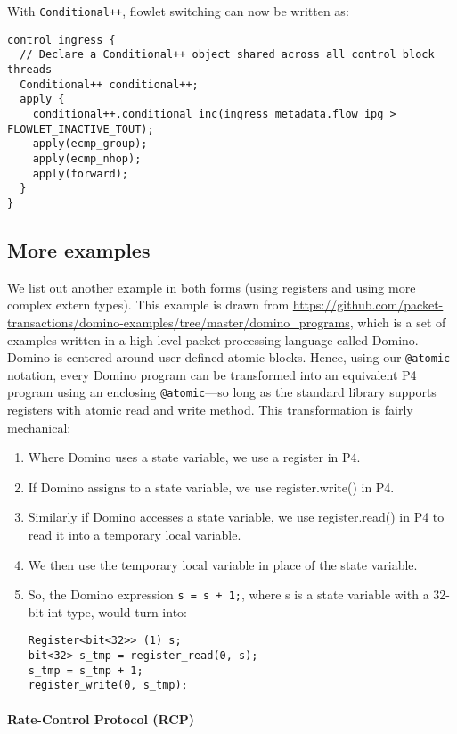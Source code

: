 With \texttt{Conditional++}, flowlet switching can now be written as:
\begin{verbatim}
control ingress {
  // Declare a Conditional++ object shared across all control block threads
  Conditional++ conditional++;
  apply {
    conditional++.conditional_inc(ingress_metadata.flow_ipg > FLOWLET_INACTIVE_TOUT);
    apply(ecmp_group);
    apply(ecmp_nhop);
    apply(forward);
  }
}
\end{verbatim}

\subsection{More examples}

We list out another example in both forms (using registers and using more
complex extern types). This example is drawn from
\url{https://github.com/packet-transactions/domino-examples/tree/master/domino_programs},
which is a set of examples written in a high-level packet-processing language
called Domino. Domino is centered around user-defined atomic blocks. Hence, using
our \texttt{@atomic} notation, every Domino program can be transformed into an
equivalent P4 program using an enclosing \texttt{@atomic}---so long as the standard
library supports registers with atomic read and write method. This transformation
is fairly mechanical:
\begin{enumerate}
\item Where Domino uses a state variable, we use a register in P4.
\item If Domino assigns to a state variable, we use register.write() in P4.
\item Similarly if Domino accesses a state variable, we use register.read() in P4
to read it into a temporary local variable.
\item We then use the temporary local variable in place of the state variable.
\item So, the Domino expression \texttt{s = s + 1;}, where s is a state variable with a 32-bit
int type, would
turn into:
\begin{verbatim}
Register<bit<32>> (1) s;
bit<32> s_tmp = register_read(0, s);
s_tmp = s_tmp + 1;
register_write(0, s_tmp);
\end{verbatim}

\end{enumerate}

\paragraph{Rate-Control Protocol (RCP)}

